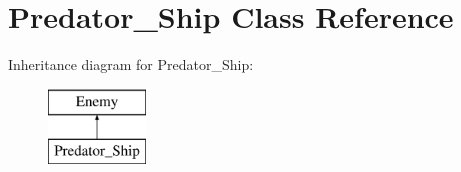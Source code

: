 \hypertarget{class_predator___ship}{}\section{Predator\+\_\+\+Ship Class Reference}
\label{class_predator___ship}
Inheritance diagram for Predator\+\_\+\+Ship\+:\begin{figure}[H]
\begin{center}
\leavevmode
\includegraphics[height=2.000000cm]{class_predator___ship}
\end{center}
\end{figure}
